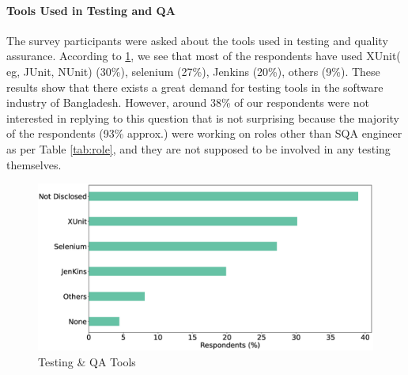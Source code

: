 \paragraph{Tools Used in Testing and QA}
The survey participants were asked about the tools used in testing and quality assurance. According to \ref{fig:testingTools}, we see that most of the respondents have used XUnit( eg, JUnit, NUnit) (30\%), selenium (27\%), Jenkins (20\%), others (9\%). These results show that there exists a great demand for testing tools in the software industry of Bangladesh. However, around 38\% of our respondents were not interested in replying to this question that is not surprising because the majority of the respondents (93\% approx.) were working on roles other than SQA engineer as per Table \ref{tab:role}, and they are not supposed to be involved in any testing themselves.  

\begin{figure}[h]
\centering
  \includegraphics[scale=0.18]{Figures/Respondents_testing_tools}
  \caption{Testing \& QA Tools}
  \label{fig:testingTools}
\end{figure}



